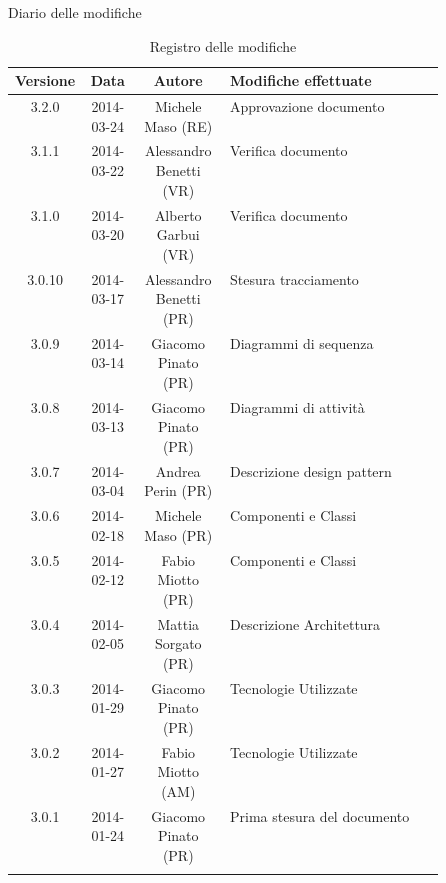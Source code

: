 
\newpage
Diario delle modifiche
\begin{center}
\begin{longtable}{|c|c|c|p{0.5\linewidth}|}
\toprule
\textbf{Versione} & \textbf{Data} & \textbf{Autore} & \textbf{Modifiche effettuate}\\

\midrule
3.2.0 & 2014-03-24 & Michele Maso (RE) & Approvazione documento\\
\midrule
3.1.1 & 2014-03-22 & Alessandro Benetti (VR) & Verifica documento\\
\midrule
3.1.0 & 2014-03-20 & Alberto Garbui (VR) & Verifica documento\\
\midrule
3.0.10 & 2014-03-17 & Alessandro Benetti (PR) & Stesura tracciamento\\
\midrule
3.0.9 & 2014-03-14 & Giacomo Pinato (PR) & Diagrammi di sequenza\\
\midrule
3.0.8 & 2014-03-13 & Giacomo Pinato (PR) & Diagrammi di attività\\
\midrule
3.0.7 & 2014-03-04 & Andrea Perin (PR) & Descrizione design pattern\\
\midrule
3.0.6 & 2014-02-18 & Michele Maso (PR) & Componenti e Classi\\
\midrule
3.0.5 & 2014-02-12 & Fabio Miotto (PR) & Componenti e Classi\\
\midrule
3.0.4 & 2014-02-05 & Mattia Sorgato (PR) & Descrizione Architettura\\
\midrule
3.0.3 & 2014-01-29 & Giacomo Pinato (PR) & Tecnologie Utilizzate\\
\midrule
3.0.2 & 2014-01-27 & Fabio Miotto (AM) & Tecnologie Utilizzate\\
\midrule
3.0.1 & 2014-01-24 & Giacomo Pinato (PR) & Prima stesura del documento\\

\bottomrule
\caption{Registro delle modifiche}
\label{tab:changelog}

\end{longtable}
\end{center}

\newpage
\tableofcontents

\newpage
\listoffigures %

